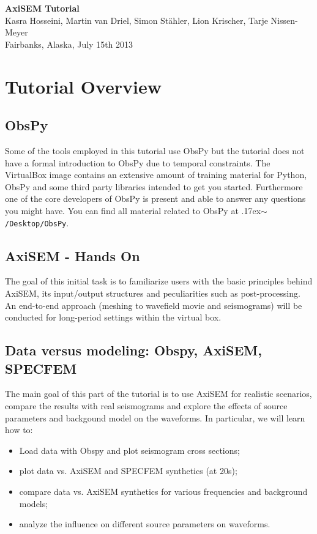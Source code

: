 \documentclass{article}
\newcommand{\ttilde}[0]{\raise.17ex\hbox{$\scriptstyle\sim$}}
\begin{document}
\begin{center}
\title{}
\LARGE{ \textbf{\sc AxiSEM Tutorial}}
\vspace*{0.1cm}\\
{\large 
Kasra Hosseini, Martin van Driel, Simon St\"{a}hler, 
Lion Krischer, Tarje Nissen-Meyer \\
{Fairbanks, Alaska, July 15th 2013}
}
\end{center}

%
\section{Tutorial Overview}
%
\subsection{ObsPy}
Some of the tools employed in this tutorial use ObsPy but the tutorial
does not have a formal introduction to ObsPy due to temporal
constraints. The VirtualBox image contains an extensive amount of
training material for Python, ObsPy and some third party libraries
intended to get you started. Furthermore one of the core developers of
ObsPy is present and able to answer any questions you might have. You
can find all material related to ObsPy at \ttilde\verb|/Desktop/ObsPy|.
%
\subsection{AxiSEM - Hands On}
The goal of this initial task is to familiarize users with the basic
principles behind AxiSEM, its input/output structures and
peculiarities such as post-processing. An end-to-end approach (meshing to
wavefield movie and seismograms) will be conducted for long-period
settings within the virtual box.
%
\subsection{Data versus modeling: Obspy, AxiSEM, SPECFEM}
The main goal of this part of the tutorial is to use AxiSEM for realistic scenarios, compare the 
results with real seismograms and explore the effects of source parameters and 
backgound model on the waveforms. In particular, we will learn how to:

\begin{itemize}
    \item Load data with Obspy and plot seismogram cross sections;
    \item plot data vs. AxiSEM and SPECFEM synthetics (at 20s);
    \item compare data vs. AxiSEM synthetics for various frequencies and background
          models;
    \item analyze the influence on different source parameters on waveforms.
\end{itemize}
\end{document}
